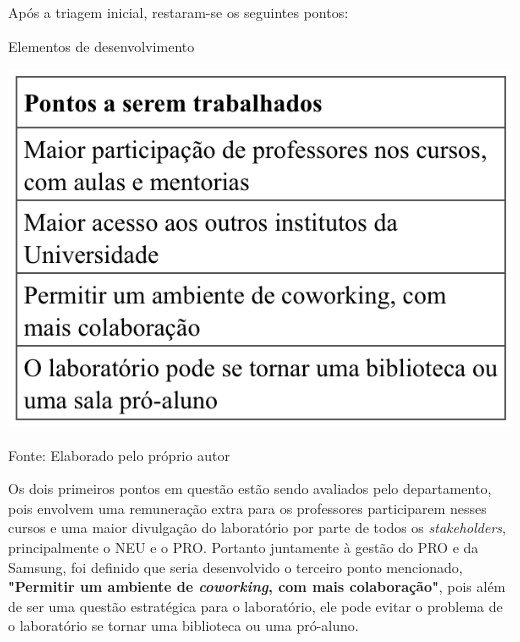 Após a triagem inicial, restaram-se os seguintes pontos:

\begin{table}[h]
\caption{Elementos de desenvolvimento}
\centerline{\includegraphics[scale=0.75]{img/pontosselecionados}}
\label{fig:pontosselecionados}
\caption* {Fonte: Elaborado pelo próprio autor}
\end{table}

Os dois primeiros pontos em questão estão sendo avaliados pelo departamento, pois envolvem uma remuneração extra para os professores participarem nesses cursos e uma maior divulgação do laboratório por parte de todos os \textit{stakeholders}, principalmente o NEU e o PRO. Portanto juntamente à gestão do PRO e da Samsung, foi definido que seria desenvolvido o terceiro ponto mencionado, \textbf{"Permitir um ambiente de \textit{coworking}, com mais colaboração"}, pois além de ser uma questão estratégica para o laboratório, ele pode evitar o problema de o laboratório se tornar uma biblioteca ou uma pró-aluno.
